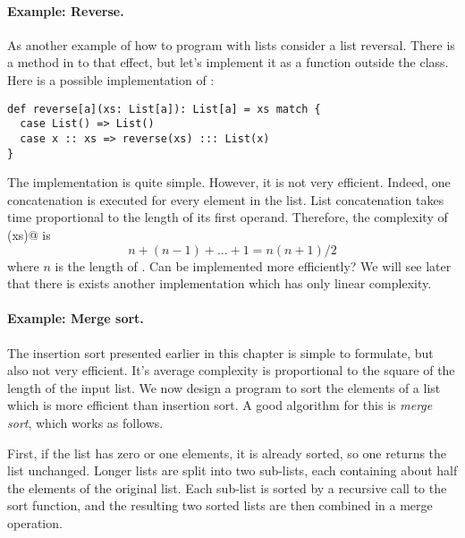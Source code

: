 \documentclass[11pt]{book}
\begin{document}
\paragraph{Example: Reverse.} As another example of how to program with
lists consider a list reversal. There is a method \verb@reverse@ in
\verb@List@ to that effect, but let's implement it as a function
outside the class. Here is a possible implementation of
\verb@reverse@:
\begin{verbatim}
def reverse[a](xs: List[a]): List[a] = xs match {
  case List() => List()
  case x :: xs => reverse(xs) ::: List(x)
}
\end{verbatim}
The implementation is quite simple. However, it is not very efficient.
Indeed, one concatenation is executed for every element in the
list. List concatenation takes time proportional to the length
of its first operand. Therefore, the complexity of \verb@reverse(xs)@ is 
\[
n + (n - 1) + ... + 1 = n(n+1)/2
\]
where $n$ is the length of \verb@xs@. Can \verb@reverse@ be
implemented more efficiently? We will see later that there is exists
another implementation which has only linear complexity.

\paragraph{Example: Merge sort.}
The insertion sort presented earlier in this chapter is simple to
formulate, but also not very efficient. It's average complexity is
proportional to the square of the length of the input list. We now
design a program to sort the elements of a list which is more
efficient than insertion sort. A good algorithm for this is {\em merge
sort}, which works as follows.

First, if the list has zero or one elements, it is already sorted, so
one returns the list unchanged. Longer lists are split into two
sub-lists, each containing about half the elements of the original
list. Each sub-list is sorted by a recursive call to the sort
function, and the resulting two sorted lists are then combined in a
merge operation.
\end{document}
